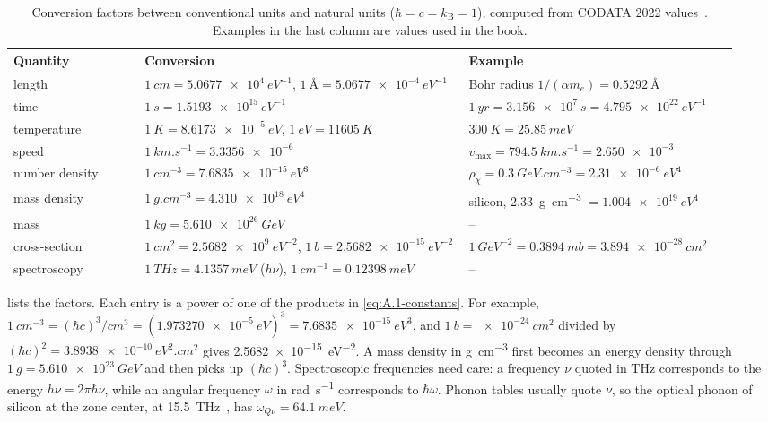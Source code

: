 \begin{table}[t]
  \centering
  \caption{Conversion factors between conventional units and natural units ($\hbar = c = k_{\mathrm{B}} = 1$), computed from CODATA 2022 values~\cite{mohr2025codata}. Examples in the last column are values used in the book.}
  \label{tab:A-conversions}
  \small
  \begin{tabular}{@{}p{0.17\linewidth}p{0.42\linewidth}p{0.35\linewidth}@{}}
    \toprule
    Quantity & Conversion & Example \\
    \midrule
    length & $\SI{1}{cm} = \SI{5.0677e4}{eV^{-1}}$, $\SI{1}{\angstrom} = \SI{5.0677e-4}{eV^{-1}}$ & Bohr radius $1/(\alpha m_e) = \SI{0.5292}{\angstrom}$ \\
    time & $\SI{1}{s} = \SI{1.5193e15}{eV^{-1}}$ & $\SI{1}{yr} = \SI{3.156e7}{s} = \SI{4.795e22}{eV^{-1}}$ \\
    temperature & $\SI{1}{K} = \SI{8.6173e-5}{eV}$, $\SI{1}{eV} = \SI{11605}{K}$ & $\SI{300}{K} = \SI{25.85}{meV}$ \\
    speed & $\SI{1}{km.s^{-1}} = \num{3.3356e-6}$ & $v_{\mathrm{max}} = \SI{794.5}{km.s^{-1}} = \num{2.650e-3}$ \\
    number density & $\SI{1}{cm^{-3}} = \SI{7.6835e-15}{eV^3}$ & $\rho_\chi = \SI{0.3}{GeV.cm^{-3}} = \SI{2.31e-6}{eV^4}$ \\
    mass density & $\SI{1}{g.cm^{-3}} = \SI{4.310e18}{eV^4}$ & silicon, \SI{2.33}{g.cm^{-3}} $= \SI{1.004e19}{eV^4}$ \\
    mass & $\SI{1}{kg} = \SI{5.610e26}{GeV}$ & -- \\
    cross-section & $\SI{1}{cm^2} = \SI{2.5682e9}{eV^{-2}}$, $\SI{1}{b} = \SI{2.5682e-15}{eV^{-2}}$ & $\SI{1}{GeV^{-2}} = \SI{0.3894}{mb} = \SI{3.894e-28}{cm^2}$ \\
    spectroscopy & $\SI{1}{THz} = \SI{4.1357}{meV}$ ($h\nu$), $\SI{1}{cm^{-1}} = \SI{0.12398}{meV}$ & -- \\
    \bottomrule
  \end{tabular}
\end{table}

 lists the factors. Each entry is a power of one of the products in \cref{eq:A.1-constants}. For example, $\SI{1}{cm^{-3}} = (\hbar c)^3/\si{cm^3} = (\SI{1.973270e-5}{eV})^3 = \SI{7.6835e-15}{eV^3}$, and $\SI{1}{b} = \SI{e-24}{cm^2}$ divided by $(\hbar c)^2 = \SI{3.8938e-10}{eV^2.cm^2}$ gives \SI{2.5682e-15}{eV^{-2}}. A mass density in \si{g.cm^{-3}} first becomes an energy density through $\SI{1}{g} = \SI{5.610e23}{GeV}$ and then picks up $(\hbar c)^3$. Spectroscopic frequencies need care: a frequency $\nu$ quoted in \si{THz} corresponds to the energy $h\nu = 2\pi\hbar\nu$, while an angular frequency $\omega$ in \si{rad.s^{-1}} corresponds to $\hbar\omega$. Phonon tables usually quote $\nu$, so the optical phonon of silicon at the zone center, at \SI{15.5}{THz}~\cite{nilsson1972study}, has $\omega_{Q\nu} = \SI{64.1}{meV}$.


